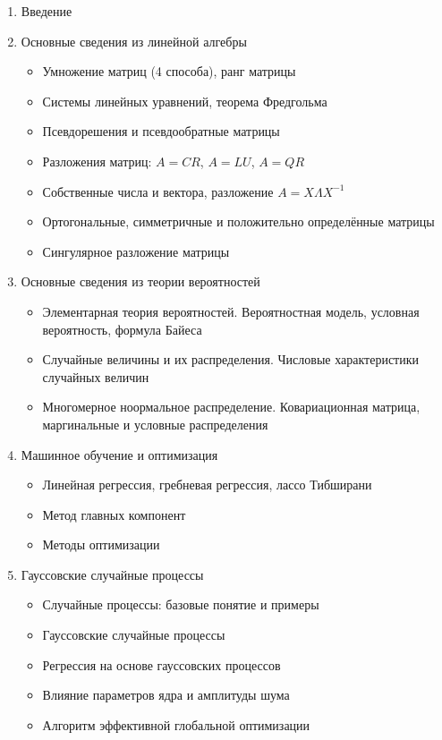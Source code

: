 \documentclass[11pt,a4paper]{article}
\providecommand{\tightlist}{%
      \setlength{\itemsep}{0pt}\setlength{\parskip}{0pt}}
\begin{document}
\begin{enumerate}
\def\labelenumi{\arabic{enumi}.}
\tightlist
\item
  Введение
\item
  Основные сведения из линейной алгебры

  \begin{itemize}
  \tightlist
  \item
    Умножение матриц (4 способа), ранг матрицы
  \item
    Системы линейных уравнений, теорема Фредгольма
  \item
    Псевдорешения и псевдообратные матрицы
  \item
    Разложения матриц: \(A=CR\), \(A=LU\), \(A=QR\)
  \item
    Собственные числа и вектора, разложение \(A = X \Lambda X^{-1}\)
  \item
    Ортогональные, симметричные и положительно определённые матрицы
  \item
    Сингулярное разложение матрицы
  \end{itemize}
\item
  Основные сведения из теории вероятностей

  \begin{itemize}
  \tightlist
  \item
    Элементарная теория вероятностей. Вероятностная модель, условная
    вероятность, формула Байеса
  \item
    Случайные величины и их распределения. Числовые характеристики
    случайных величин
  \item
    Многомерное ноормальное распределение. Ковариационная матрица,
    маргинальные и условные распределения
  \end{itemize}
\item
  Машинное обучение и оптимизация

  \begin{itemize}
  \tightlist
  \item
    Линейная регрессия, гребневая регрессия, лассо Тибширани
  \item
    Метод главных компонент
  \item
    Методы оптимизации
  \end{itemize}
\item
  Гауссовские случайные процессы

  \begin{itemize}
  \tightlist
  \item
    Случайные процессы: базовые понятие и примеры
  \item
    Гауссовские случайные процессы
  \item
    Регрессия на основе гауссовских процессов
  \item
    Влияние параметров ядра и амплитуды шума
  \item
    Алгоритм эффективной глобальной оптимизации
  \end{itemize}
\end{enumerate}
\end{document}
